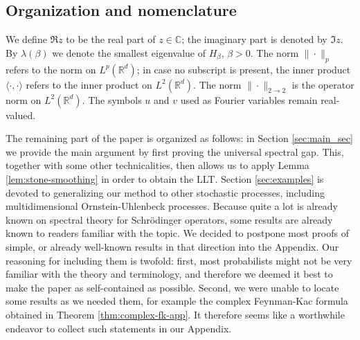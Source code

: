\documentclass[11pt,reqno]{amsart}
\theoremstyle{definition}
\numberwithin{equation}{section}
\newcommand{\<}{\langle}
\renewcommand{\>}{\rangle}
\begin{document}
\subsection{Organization and nomenclature}
We define $\Re z$ to be the real part of $z\in\mathbb C$; the imaginary part is denoted by $\Im z$. By $\lambda(\beta)$ we denote the smallest eigenvalue of $H_\beta$, $\beta>0$. The norm $\|\cdot\|_p$ refers to the norm on $L^p(\mathbb R^d)$; in case no subscript is present, the inner product $\langle\cdot,\cdot\rangle$ refers to the inner product on $L^2(\mathbb R^d)$. The norm $\|\cdot\|_{2\to2}$ is the operator norm on $L^2(\mathbb R^d)$. The symbols $u$ and $v$ used as Fourier variables remain real-valued.

The remaining part of the paper is organized as follows: in Section \ref{sec:main_sec} we provide the main argument by first proving the universal spectral gap. This, together with some other technicalities, then allows us to apply Lemma \ref{lem:stone-smoothing} in order to obtain the LLT. Section \ref{sec:examples} is devoted to generalizing our method to other stochastic processes, including multidimensional Ornstein-Uhlenbeck processes.
Because quite a lot is already known on spectral theory for Schrödinger operators, some results are already known to readers familiar with the topic. We decided to postpone most proofs of simple, or already well-known results in that direction into the Appendix. Our reasoning for including them is twofold: first, most probabilists might not be very familiar with the theory and terminology, and therefore we deemed it best to make the paper as self-contained as possible. Second, we were unable to locate some results as we needed them, for example the complex Feynman-Kac formula obtained in Theorem \ref{thm:complex-fk-app}. It therefore seems like a worthwhile endeavor to collect such statements in our Appendix.
\end{document}
